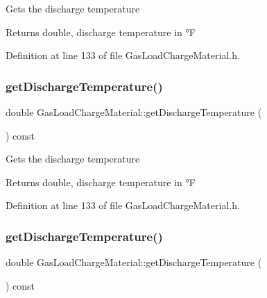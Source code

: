 Gets the discharge temperature \begin{DoxyReturn}{Returns}
double, discharge temperature in °F 
\end{DoxyReturn}


Definition at line 133 of file Gas\+Load\+Charge\+Material.\+h.

\mbox{\label{class_gas_load_charge_material_a6baaf6ad65e2a3d1fa90b7c007bc3c53}} 
\subsubsection{\texorpdfstring{get\+Discharge\+Temperature()}{getDischargeTemperature()}\hspace{0.1cm}{\footnotesize\ttfamily [2/3]}}
{\footnotesize\ttfamily double Gas\+Load\+Charge\+Material\+::get\+Discharge\+Temperature (\begin{DoxyParamCaption}{ }\end{DoxyParamCaption}) const\hspace{0.3cm}{\ttfamily [inline]}}

Gets the discharge temperature \begin{DoxyReturn}{Returns}
double, discharge temperature in °F 
\end{DoxyReturn}


Definition at line 133 of file Gas\+Load\+Charge\+Material.\+h.

\mbox{\label{class_gas_load_charge_material_a6baaf6ad65e2a3d1fa90b7c007bc3c53}} 
\subsubsection{\texorpdfstring{get\+Discharge\+Temperature()}{getDischargeTemperature()}\hspace{0.1cm}{\footnotesize\ttfamily [3/3]}}
{\footnotesize\ttfamily double Gas\+Load\+Charge\+Material\+::get\+Discharge\+Temperature (\begin{DoxyParamCaption}{ }\end{DoxyParamCaption}) const\hspace{0.3cm}{\ttfamily [inline]}}

